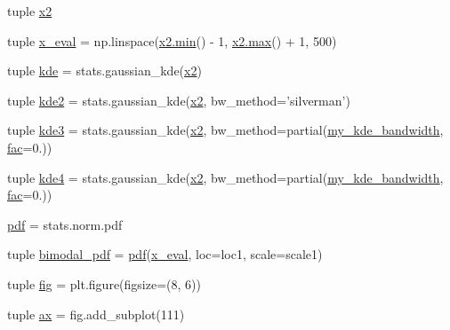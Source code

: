 \begin{DoxyCompactItemize}
\item 
tuple \hyperlink{namespacekde__plot4_a5685a6f3a65c974be74b68de043b0cb1}{x2}
\item 
tuple \hyperlink{namespacekde__plot4_a5da9f162e7d9d864ade43526c1123302}{x\+\_\+eval} = np.\+linspace(\hyperlink{vecbfn_8cc_aa3e27e02424d28adfcf9d2b934e741a1}{x2.\+min}() -\/ 1, \hyperlink{vecbfn_8cc_a71f214d4a304fdc2089c54dbaf979fe5}{x2.\+max}() + 1, 500)
\item 
tuple \hyperlink{namespacekde__plot4_ab68409392bf7a42c940367c17a97a3a2}{kde} = stats.\+gaussian\+\_\+kde(\hyperlink{namespacekde__plot4_a5685a6f3a65c974be74b68de043b0cb1}{x2})
\item 
tuple \hyperlink{namespacekde__plot4_a13f4c30d2bd26c7baabd8a9d2df00eda}{kde2} = stats.\+gaussian\+\_\+kde(\hyperlink{namespacekde__plot4_a5685a6f3a65c974be74b68de043b0cb1}{x2}, bw\+\_\+method='silverman')
\item 
tuple \hyperlink{namespacekde__plot4_a4da0f8c149097a740bafcf2919314a5a}{kde3} = stats.\+gaussian\+\_\+kde(\hyperlink{namespacekde__plot4_a5685a6f3a65c974be74b68de043b0cb1}{x2}, bw\+\_\+method=partial(\hyperlink{namespacekde__plot4_a907cf90ce6515ae18c2bd01c3f347e8b}{my\+\_\+kde\+\_\+bandwidth}, \hyperlink{protos_8h_abc0aa000e7fe04b5142d65d7e628f79a}{fac}=0.))
\item 
tuple \hyperlink{namespacekde__plot4_aa099442190379cc2a276bf2f0775cabf}{kde4} = stats.\+gaussian\+\_\+kde(\hyperlink{namespacekde__plot4_a5685a6f3a65c974be74b68de043b0cb1}{x2}, bw\+\_\+method=partial(\hyperlink{namespacekde__plot4_a907cf90ce6515ae18c2bd01c3f347e8b}{my\+\_\+kde\+\_\+bandwidth}, \hyperlink{protos_8h_abc0aa000e7fe04b5142d65d7e628f79a}{fac}=0.))
\item 
\hyperlink{namespacekde__plot4_a3fcf50e40bf645f4cdd0418766bc77ae}{pdf} = stats.\+norm.\+pdf
\item 
tuple \hyperlink{namespacekde__plot4_aaeb40d1c5448587c1d295590cc15c4dc}{bimodal\+\_\+pdf} = \hyperlink{namespacekde__plot4_a3fcf50e40bf645f4cdd0418766bc77ae}{pdf}(\hyperlink{namespacekde__plot4_a5da9f162e7d9d864ade43526c1123302}{x\+\_\+eval}, loc=loc1, scale=scale1)
\item 
tuple \hyperlink{namespacekde__plot4_a3f175e7060761b2d6fc3cc1df78b3e95}{fig} = plt.\+figure(figsize=(8, 6))
\item 
tuple \hyperlink{namespacekde__plot4_a67ef57ca709f93166930472320aeea36}{ax} = fig.\+add\+\_\+subplot(111)
\end{DoxyCompactItemize}


